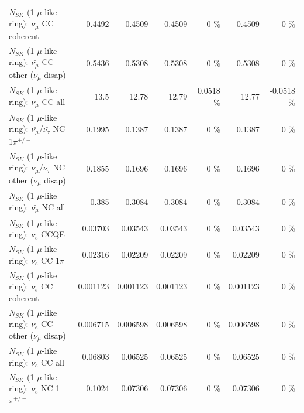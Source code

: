 \begin{table}
\begin{tabular}{| l | r | r | r  r | r  r |}
                       $N_{SK}$ (1 $\mu$-like ring): $\bar{\nu_\mu}$ CC coherent &          0.4492 &          0.4509 &          0.4509 &        0 \%  &          0.4509 &        0 \%  \\ 
        $N_{SK}$ (1 $\mu$-like ring): $\bar{\nu_\mu}$ CC other ($\nu_\mu$ disap) &          0.5436 &          0.5308 &          0.5308 &        0 \%  &          0.5308 &        0 \%  \\ 
                          $N_{SK}$ (1 $\mu$-like ring): $\bar{\nu_{\mu}}$ CC all &            13.5 &           12.78 &           12.79 &   0.0518 \%  &           12.77 &  -0.0518 \%  \\ 
\hline
  $N_{SK}$ (1 $\mu$-like ring): $\bar{\nu_\mu}$/$\bar{\nu_\tau}$ NC 1$\pi^{+/-}$ &          0.1995 &          0.1387 &          0.1387 &        0 \%  &          0.1387 &        0 \%  \\ 
$N_{SK}$ (1 $\mu$-like ring): $\bar{\nu_\mu}$/$\bar{\nu_\tau}$ NC other ($\nu_\mu$ disap) &          0.1855 &          0.1696 &          0.1696 &        0 \%  &          0.1696 &        0 \%  \\ 
                          $N_{SK}$ (1 $\mu$-like ring): $\bar{\nu_{\mu}}$ NC all &           0.385 &          0.3084 &          0.3084 &        0 \%  &          0.3084 &        0 \%  \\ 
\hline
\hline
\hline
                                      $N_{SK}$ (1 $\mu$-like ring): $\nu_e$ CCQE &         0.03703 &         0.03543 &         0.03543 &        0 \%  &         0.03543 &        0 \%  \\ 
                                 $N_{SK}$ (1 $\mu$-like ring): $\nu_e$ CC 1$\pi$ &         0.02316 &         0.02209 &         0.02209 &        0 \%  &         0.02209 &        0 \%  \\ 
                               $N_{SK}$ (1 $\mu$-like ring): $\nu_e$ CC coherent &        0.001123 &        0.001123 &        0.001123 &        0 \%  &        0.001123 &        0 \%  \\ 
                $N_{SK}$ (1 $\mu$-like ring): $\nu_e$ CC other ($\nu_\mu$ disap) &        0.006715 &        0.006598 &        0.006598 &        0 \%  &        0.006598 &        0 \%  \\ 
                                  $N_{SK}$ (1 $\mu$-like ring): $\nu_{e}$ CC all &         0.06803 &         0.06525 &         0.06525 &        0 \%  &         0.06525 &        0 \%  \\ 
\hline
                           $N_{SK}$ (1 $\mu$-like ring): $\nu_e$ NC 1$\pi^{+/-}$ &          0.1024 &         0.07306 &         0.07306 &        0 \%  &         0.07306 &        0 \%  \\ 

\end{tabular}
\end{table}

